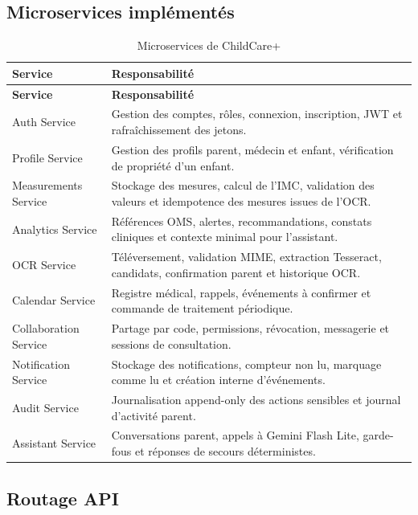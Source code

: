 \subsection{Microservices implémentés}

\begin{longtable}{|p{4cm}|p{10cm}|}
\caption{Microservices de ChildCare+}
\label{tab:microservices}\\
\hline
\textbf{Service} & \textbf{Responsabilité} \\
\hline
\endfirsthead
\hline
\textbf{Service} & \textbf{Responsabilité} \\
\hline
\endhead
Auth Service & Gestion des comptes, rôles, connexion, inscription, JWT et rafraîchissement des jetons. \\
\hline
Profile Service & Gestion des profils parent, médecin et enfant, vérification de propriété d'un enfant. \\
\hline
Measurements Service & Stockage des mesures, calcul de l'IMC, validation des valeurs et idempotence des mesures issues de l'OCR. \\
\hline
Analytics Service & Références OMS, alertes, recommandations, constats cliniques et contexte minimal pour l'assistant. \\
\hline
OCR Service & Téléversement, validation MIME, extraction Tesseract, candidats, confirmation parent et historique OCR. \\
\hline
Calendar Service & Registre médical, rappels, événements à confirmer et commande de traitement périodique. \\
\hline
Collaboration Service & Partage par code, permissions, révocation, messagerie et sessions de consultation. \\
\hline
Notification Service & Stockage des notifications, compteur non lu, marquage comme lu et création interne d'événements. \\
\hline
Audit Service & Journalisation append-only des actions sensibles et journal d'activité parent. \\
\hline
Assistant Service & Conversations parent, appels à Gemini Flash Lite, garde-fous et réponses de secours déterministes. \\
\hline
\end{longtable}

\subsection{Routage API}

